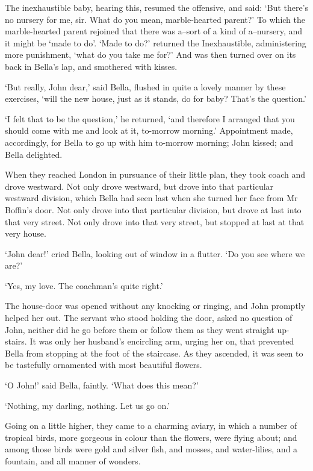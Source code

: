 The inexhaustible baby, hearing this, resumed the offensive, and said:
‘But there’s no nursery for me, sir. What do you mean, marble-hearted
parent?’ To which the marble-hearted parent rejoined that there was
a--sort of a kind of a--nursery, and it might be ‘made to do’. ‘Made to
do?’ returned the Inexhaustible, administering more punishment, ‘what do
you take me for?’ And was then turned over on its back in Bella’s lap,
and smothered with kisses.

‘But really, John dear,’ said Bella, flushed in quite a lovely manner
by these exercises, ‘will the new house, just as it stands, do for baby?
That’s the question.’

‘I felt that to be the question,’ he returned, ‘and therefore I arranged
that you should come with me and look at it, to-morrow morning.’
Appointment made, accordingly, for Bella to go up with him to-morrow
morning; John kissed; and Bella delighted.

When they reached London in pursuance of their little plan, they took
coach and drove westward. Not only drove westward, but drove into that
particular westward division, which Bella had seen last when she turned
her face from Mr Boffin’s door. Not only drove into that particular
division, but drove at last into that very street. Not only drove into
that very street, but stopped at last at that very house.

‘John dear!’ cried Bella, looking out of window in a flutter. ‘Do you
see where we are?’

‘Yes, my love. The coachman’s quite right.’

The house-door was opened without any knocking or ringing, and John
promptly helped her out. The servant who stood holding the door, asked
no question of John, neither did he go before them or follow them as
they went straight up-stairs. It was only her husband’s encircling arm,
urging her on, that prevented Bella from stopping at the foot of the
staircase. As they ascended, it was seen to be tastefully ornamented
with most beautiful flowers.

‘O John!’ said Bella, faintly. ‘What does this mean?’

‘Nothing, my darling, nothing. Let us go on.’

Going on a little higher, they came to a charming aviary, in which a
number of tropical birds, more gorgeous in colour than the flowers,
were flying about; and among those birds were gold and silver fish, and
mosses, and water-lilies, and a fountain, and all manner of wonders.

